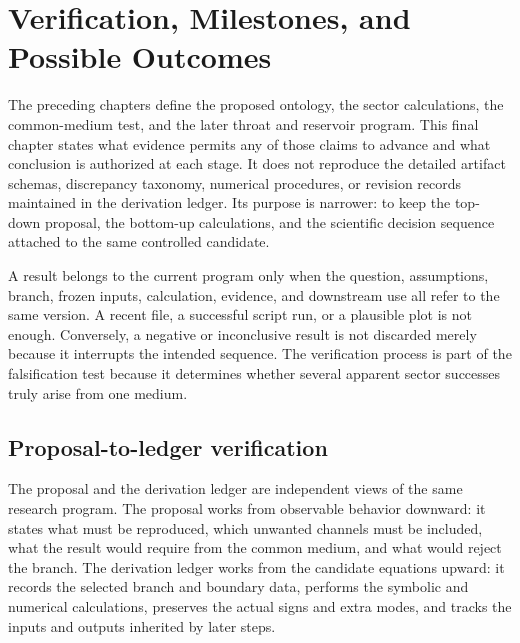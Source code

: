 
\chapter{Verification, Milestones, and Possible Outcomes}
\label{ch:verification-milestones-outcomes}

The preceding chapters define the proposed ontology, the sector calculations,
the common-medium test, and the later throat and reservoir program. This final
chapter states what evidence permits any of those claims to advance and what
conclusion is authorized at each stage. It does not reproduce the detailed
artifact schemas, discrepancy taxonomy, numerical procedures, or revision
records maintained in the derivation ledger. Its purpose is narrower: to keep
the top-down proposal, the bottom-up calculations, and the scientific decision
sequence attached to the same controlled candidate.

A result belongs to the current program only when the question, assumptions,
branch, frozen inputs, calculation, evidence, and downstream use all refer to
the same version. A recent file, a successful script run, or a plausible plot is
not enough. Conversely, a negative or inconclusive result is not discarded
merely because it interrupts the intended sequence. The verification process is
part of the falsification test because it determines whether several apparent
sector successes truly arise from one medium.

\section{Proposal-to-ledger verification}

The proposal and the derivation ledger are independent views of the same
research program. The proposal works from observable behavior downward: it
states what must be reproduced, which unwanted channels must be included, what
the result would require from the common medium, and what would reject the
branch. The derivation ledger works from the candidate equations upward: it
records the selected branch and boundary data, performs the symbolic and
numerical calculations, preserves the actual signs and extra modes, and tracks
the inputs and outputs inherited by later steps.

